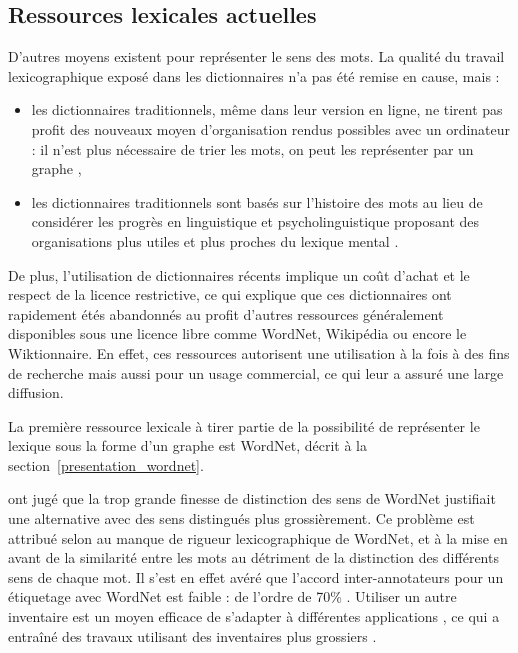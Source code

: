 \subsection{Ressources lexicales actuelles}
\label{subsec:ressources_lexicales}

D'autres moyens existent pour représenter le sens des mots. La qualité du
travail lexicographique exposé dans les dictionnaires n'a pas été remise en
cause, mais :

\begin{itemize}

    \item les dictionnaires traditionnels, même dans leur version en ligne, ne
        tirent pas profit des nouveaux moyen d'organisation rendus possibles
        avec un ordinateur : il n'est plus nécessaire de trier les mots, on
        peut les représenter par un graphe
        \citep{miller1990introduction,polguere2013tissage},

    \item les dictionnaires traditionnels sont basés sur l'histoire des mots au
        lieu de considérer les progrès en linguistique et psycholinguistique
        proposant des organisations plus utiles et plus proches du lexique
        mental \citep{miller1990introduction}.

\end{itemize}

De plus, l'utilisation de dictionnaires récents implique un coût d'achat et le
respect de la licence restrictive, ce qui explique que ces dictionnaires ont
rapidement étés abandonnés au profit d'autres ressources généralement
disponibles sous une licence libre comme WordNet, Wikipédia ou encore le
Wiktionnaire. En effet, ces ressources autorisent une utilisation à la fois à
des fins de recherche mais aussi pour un usage commercial, ce qui leur a assuré
une large diffusion.

La première ressource lexicale à tirer partie de la possibilité de représenter
le lexique sous la forme d'un graphe est WordNet, décrit à la
section~\ref{presentation_wordnet}.

\cite{hovy2006ontonotes,ide2006making,navigli2007semeval,snow2007learning} ont
jugé que la trop grande finesse de distinction des sens de WordNet justifiait
une alternative avec des sens distingués plus grossièrement. Ce problème est
attribué selon \cite{edmonds2002introduction} au manque de rigueur
lexicographique de WordNet, et à la mise en avant de la similarité entre les
mots au détriment de la distinction des différents sens de chaque mot. Il s'est
en effet avéré que l'accord inter-annotateurs pour un étiquetage avec WordNet
est faible : de l'ordre de 70\% \citep{snyder2004english}.  Utiliser un autre
inventaire est un moyen efficace de s'adapter à différentes applications
\citep{palmer2004different}, ce qui a entraîné des travaux utilisant des
inventaires plus grossiers \citep{navigli2007semeval}.

